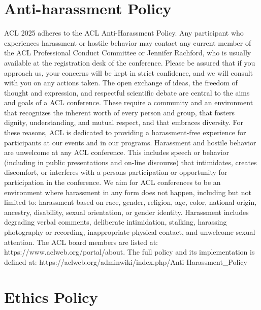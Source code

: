 \chapter{Anti-harassment Policy}
\vspace*{0.2cm}

ACL 2025 adheres to the ACL Anti-Harassment Policy. Any participant who experiences harassment or hostile behavior may contact any current member of the ACL Professional Conduct Committee or Jennifer Rachford, who is usually available at the registration desk of the conference. Please be assured that if you approach us, your concerns will be kept in strict confidence, and we will consult with you on any actions taken. The open exchange of ideas, the freedom of thought and expression, and respectful scientific debate are central to the aims and goals of a ACL conference. These require a community and an environment that recognizes the inherent worth of every person and group, that fosters dignity, understanding, and mutual respect, and that embraces diversity. For these reasons, ACL is dedicated to providing a harassment-free experience for participants at our events and in our programs. 
Harassment and hostile behavior are unwelcome at any ACL conference. This includes speech or behavior (including in public presentations and on-line discourse) that intimidates, creates discomfort, or interferes with a persons participation or opportunity for participation in the conference. We aim for ACL conferences to be an environment where harassment in any form does not happen, including but not limited to: harassment based on race, gender, religion, age, color, national origin, ancestry, disability, sexual orientation, or gender identity. 
Harassment includes degrading verbal comments, deliberate intimidation, stalking, harassing photography or recording, inappropriate physical contact, and unwelcome sexual attention. 
The ACL board members are listed at: 
https://www.aclweb.org/portal/about. 
The full policy and its implementation is defined at: 
https://aclweb.org/adminwiki/index.php/Anti-Harassment\_Policy

\clearpage

\chapter{Ethics Policy}
\vspace*{0.2cm}

